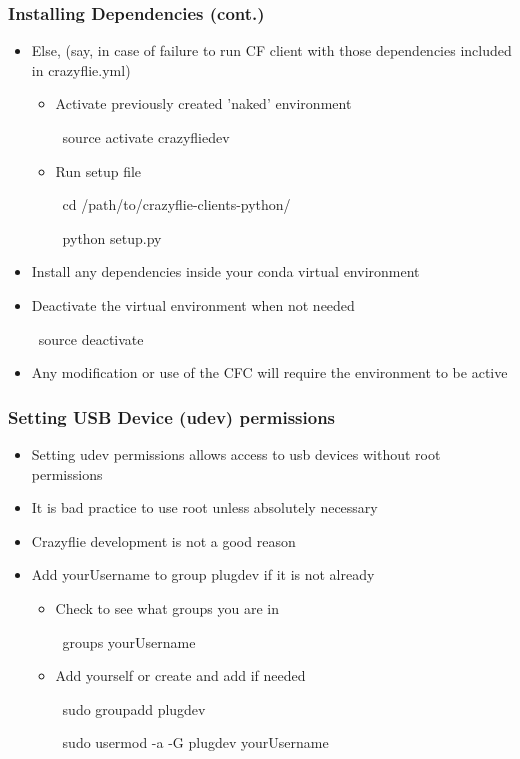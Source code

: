 \documentclass[t, xcolor=dvipsnames]{beamer}
\begin{document}
\begin{frame}
	\frametitle{Installing Dependencies (cont.)}
	\begin{itemize}
		\item Else, (say, in case of failure to run CF client with those dependencies included in crazyflie.yml)
		\begin{itemize}
			\item Activate previously created 'naked' environment
			\begin{semiverbatim}
			\ source activate crazyfliedev
			\end{semiverbatim}
			\item Run setup file
			\begin{semiverbatim}
			\ cd /path/to/crazyflie-clients-python/
			\end{semiverbatim}
			\begin{semiverbatim}
			\ python setup.py
			\end{semiverbatim}

		\end{itemize}
		\item Install any dependencies inside your conda virtual environment
		\item Deactivate the virtual environment when not needed
			\begin{semiverbatim}
			\ source deactivate
			\end{semiverbatim}
		\item Any modification or use of the CFC will require the environment to be active
	\end{itemize}
\end{frame}

\begin{frame}
	\frametitle{Setting USB Device (udev) permissions}
	\begin{itemize}
		\item Setting udev permissions allows access to usb devices without root permissions
		\item It is bad practice to use root unless absolutely necessary
		\item Crazyflie development is not a good reason
		\item Add yourUsername to group plugdev if it is not already
		\begin{itemize}
			\item Check to see what groups you are in	
				\begin{semiverbatim}
				\ groups yourUsername
				\end{semiverbatim}
			\item Add yourself or create and add if needed
				\begin{semiverbatim}
				\ sudo groupadd plugdev
				\end{semiverbatim}
				\begin{semiverbatim}
				\ sudo usermod -a -G plugdev yourUsername
				\end{semiverbatim}
		\end{itemize}
	\end{itemize}
\end{frame}
\end{document}
